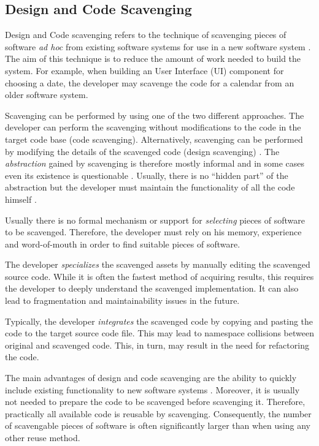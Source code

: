 \subsection{Design and Code Scavenging}

Design and Code scavenging refers to the technique of scavenging pieces of software \emph{ad hoc} from existing software systems for use in a new software system  \citep[chap.~4]{krueger_software_1992}. The aim of this technique is to reduce the amount of work needed to build the system. For example, when building an User Interface (UI) component for choosing a date, the developer may scavenge the code for a calendar from an older software system.

Scavenging can be performed by using one of the two different approaches. The developer can perform the scavenging without modifications to the code in the target code base (code scavenging). Alternatively, scavenging can be performed by modifying the details of the scavenged code (design scavenging) \citep[chap.~4]{krueger_software_1992}. The \emph{abstraction} gained by scavenging is therefore mostly informal and in some cases even its existence is questionable \citep[chap.~3]{sametinger_software_1997}. Usually, there is no ``hidden part'' of the abstraction but the developer must maintain the functionality of all the code himself \citep[chap.~3]{sametinger_software_1997}.

Usually there is no formal mechanism or support for \emph{selecting} pieces of software to be scavenged. Therefore, the developer must rely on his memory, experience and word-of-mouth in order to find suitable pieces of software. \citep[chap.~3]{sametinger_software_1997}

The developer \emph{specializes} the scavenged assets by manually editing the scavenged source code. While it is often the fastest method of acquiring results, this requires the developer to deeply understand the scavenged implementation. It can also lead to fragmentation and maintainability issues in the future. \citep[chap.~4]{krueger_software_1992}

Typically, the developer \emph{integrates} the scavenged code by copying and pasting the code to the target source code file. This may lead to namespace collisions between original and scavenged code. This, in turn, may result in the need for refactoring the code. \citep[chap.~4]{krueger_software_1992}

The main advantages of design and code scavenging are the ability to quickly include existing functionality to new software systems \citep[chap.~4]{krueger_software_1992}. Moreover, it is usually not needed to prepare the code to be scavenged before scavenging it. Therefore, practically all available code is reusable by scavenging. Consequently, the number of scavengable pieces of software is often significantly larger than when using any other reuse method. 

